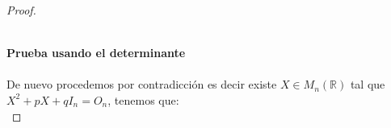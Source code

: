 \documentclass[11pt,letterpaper]{article}
\newcommand{\R}{\mathbb{R}}
\newcommand{\C}{\mathcal{C}}
\begin{document}
\begin{proof}\,\\
    \,\\

    \textbf{Prueba usando el determinante}\,\\
    \,\\
    De nuevo procedemos por contradicci\'on es decir existe $X\in M_n(\R)$ tal que $X^2+pX+qI_n=O_n$, tenemos que:\,\\
    \begin{equation*}

\end{equation*}
\end{proof}
\end{document}
